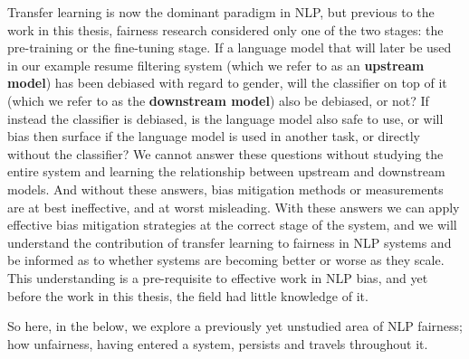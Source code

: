 Transfer learning is now the dominant paradigm in NLP, but previous to the work in this thesis, fairness research considered only one of the two stages: the pre-training or the fine-tuning stage. If a language model that will later be used in our example resume filtering system (which we refer to as an \textbf{upstream model}) has been debiased with regard to gender, will the classifier on top of it (which we refer to as the \textbf{downstream model}) also be debiased, or not? If instead the classifier is debiased, is the language model also safe to use, or will bias then surface if the language model is used in another task, or directly without the classifier? We cannot answer these questions without studying the entire system and learning the relationship between upstream and downstream models. And without these answers,
bias mitigation methods or measurements are at best ineffective, and at worst misleading. With these answers we can apply effective bias mitigation strategies at the correct stage of the system, and we will understand the contribution of transfer learning to fairness in NLP systems and be informed as to whether systems are becoming better or worse as they scale. This understanding is a pre-requisite to effective work in NLP bias, and yet before the work in this thesis, the field had little knowledge of it.

So here, in the below, we explore a previously yet unstudied area of NLP fairness; how unfairness, having entered a system, persists and travels throughout it. 

